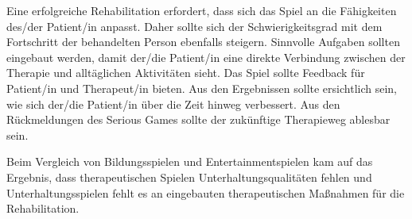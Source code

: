 Eine erfolgreiche Rehabilitation erfordert, dass sich das Spiel an die Fähigkeiten des/der Patient/in anpasst. Daher sollte sich der Schwierigkeitsgrad mit dem Fortschritt der behandelten Person ebenfalls steigern. Sinnvolle Aufgaben sollten eingebaut werden, damit der/die Patient/in eine direkte Verbindung zwischen der Therapie und alltäglichen Aktivitäten sieht. Das Spiel sollte Feedback für Patient/in und Therapeut/in bieten. Aus den Ergebnissen sollte ersichtlich sein, wie sich der/die Patient/in über die Zeit hinweg verbessert. Aus den Rückmeldungen des Serious Games sollte der zukünftige Therapieweg ablesbar sein. \cite{flores:2008:IPM:1501750.1501839}

Beim Vergleich von Bildungsspielen und Entertainmentspielen kam \citeauthor{flores:2008:IPM:1501750.1501839} auf das Ergebnis, dass therapeutischen Spielen Unterhaltungsqualitäten fehlen und Unterhaltungsspielen fehlt es an eingebauten therapeutischen Maßnahmen für die Rehabilitation. \cite{flores:2008:IPM:1501750.1501839}


